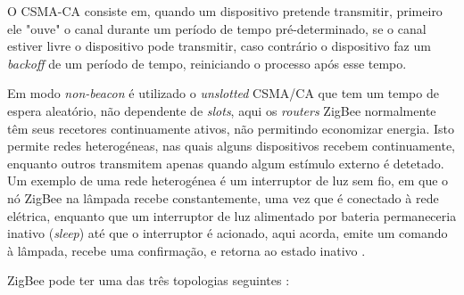 \documentclass[conference]{IEEEtran}
\begin{document}
O CSMA-CA consiste em, quando um dispositivo pretende transmitir, primeiro ele "ouve" o canal durante um período de tempo pré-determinado, se o canal estiver livre o dispositivo pode transmitir, caso contrário o dispositivo faz um \textit{backoff} de um período de tempo, reiniciando o processo após esse tempo.

Em modo \textit{non-beacon} é utilizado o \textit{unslotted} CSMA/CA que tem um tempo de espera aleatório, não dependente de \textit{slots}, aqui os \textit{routers} ZigBee normalmente têm seus recetores continuamente ativos, não permitindo economizar energia.
Isto permite redes heterogéneas, nas quais alguns dispositivos recebem continuamente, enquanto outros transmitem apenas quando algum estímulo externo é detetado. 
Um exemplo de uma rede heterogénea é um interruptor de luz sem fio, em que o nó ZigBee na lâmpada recebe constantemente, uma vez que é conectado à rede elétrica, enquanto que um interruptor de luz alimentado por bateria permaneceria inativo (\textit{sleep}) até que o interruptor é acionado, aqui acorda, emite um comando à lâmpada, recebe uma confirmação, e retorna ao estado inativo \cite{zigbee_online}.

ZigBee pode ter uma das três topologias seguintes \cite{sinem2004zigbee}: %
\end{document}

